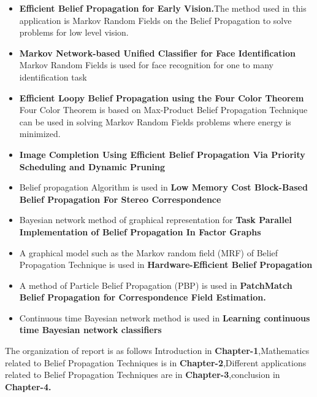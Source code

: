 \begin{itemize}
 \item \textbf{Efficient Belief Propagation for Early Vision.}The method used in this application is Markov Random  Fields on the Belief Propagation to solve problems for low level vision.                                                                 \cite{Pedro}
  \item \textbf{Markov Network-based Unified Classifier for Face Identification} Markov Random  Fields is used  for face recognition for one to many identification task                        \cite{Wonjun}
  \item \textbf{Efficient Loopy Belief Propagation using the Four Color Theorem} Four Color Theorem is based on Max-Product Belief Propagation Technique can be used in solving Markov Random  Fields problems where energy is minimized.                     \cite{Radu}
  \item \textbf{Image Completion Using Efficient Belief Propagation Via Priority Scheduling and Dynamic Pruning}           \cite{Nikos}
\end{itemize}
\begin{itemize}
   \item  Belief propagation Algorithm is used in \textbf{Low Memory Cost Block-Based Belief Propagation For Stereo Correspondence}\cite{yuchang}
   \item Bayesian network method of graphical representation for \textbf{ Task Parallel Implementation of Belief Propagation
In Factor Graphs}\cite{Nam Ma}
   \item A graphical model such as the Markov random field (MRF) of Belief Propagation Technique is used in \textbf{Hardware-Efficient Belief Propagation}\cite{Chia-KaiLiang}
 \item A method of Particle Belief Propagation (PBP) is used in \textbf{PatchMatch Belief Propagation for
Correspondence Field Estimation.}\cite{F.BESSE}
 \item Continuous time  Bayesian network method is used in \textbf{Learning continuous time Bayesian network classifiers}\cite{Daniele}
\end{itemize}
The organization of report is as follows Introduction in \textbf{Chapter-1},Mathematics related to Belief Propagation Techniques is in \textbf{Chapter-2},Different applications related to Belief Propagation Techniques are in \textbf{Chapter-3},conclusion in \textbf{Chapter-4.}



